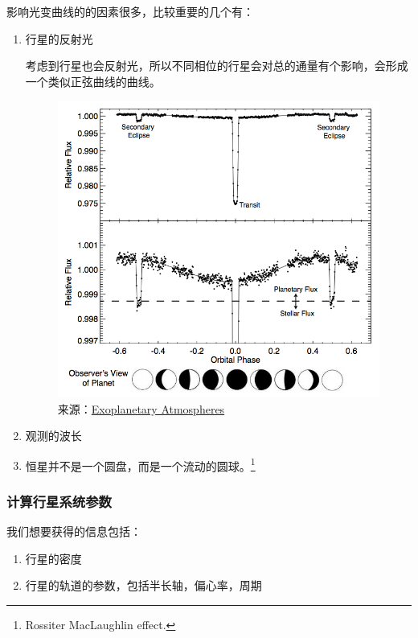 \documentclass[letterpaper,10pt,english]{sphinxmanual}
\begin{document}
影响光变曲线的的因素很多，比较重要的几个有：
\begin{enumerate}
\item {} 
行星的反射光

考虑到行星也会反射光，所以不同相位的行星会对总的通量有个影响，会形成一个类似正弦曲线的曲线。
\begin{figure}[htbp]
\centering
\capstart

\includegraphics{transitPlanetPhase.png}
\caption{来源：\href{http://arxiv.org/abs/1402.1169}{Exoplanetary Atmospheres}}\end{figure}

\item {} 
观测的波长

\item {} 
恒星并不是一个圆盘，而是一个流动的圆球。\footnote{
Rossiter MacLaughlin effect.
}

\end{enumerate}


\subsubsection{计算行星系统参数}
\label{detection:id10}
我们想要获得的信息包括：
\begin{enumerate}
\item {} 
行星的密度

\item {} 
行星的轨道的参数，包括半长轴，偏心率，周期

\end{enumerate}
\end{document}
